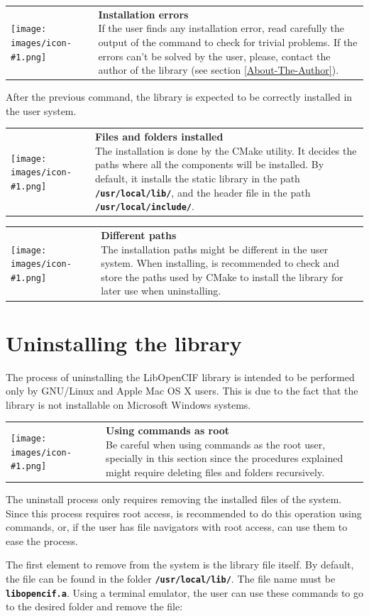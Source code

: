 \documentclass[11pt,twoside,openany,x11names,svgnames]{memoir}
\makeatletter
\newcommand{\IconNote}[3]
{
	\begin{table}[ht]
	\begin{tabular}{ lm{\dimexpr\textwidth-8\tabcolsep-\wd0}@{}}
		\toprule
		\texttt{[image: images/icon-\#1.png]}
		&
		\parbox[t]{155mm}{
		\textbf{#2} \\
		#3
		}
	\end{tabular}
\end{table}
}
\makeatother
\begin{document}
\IconNote
	{warning}
	{Installation errors}
	{If the user finds any installation error, read carefully the output of the command to check for trivial problems. If the errors can't be solved by the user, please, contact the author of the library (see section \ref{About-The-Author}).}

After the previous command, the library is expected to be correctly installed in the user system.

\IconNote
	{info}
	{Files and folders installed}
	{The installation is done by the CMake utility. It decides the paths where all the components will be installed. By default, it installs the static library in the path \textbf{\texttt{/usr/local/lib/}}, and the header file in the path \textbf{\texttt{/usr/local/include/}}.}
	
\IconNote
	{info}
	{Different paths}
	{The installation paths might be different in the user system. When installing, is recommended to check and store the paths used by CMake to install the library for later use when uninstalling.}

\section{Uninstalling the library}\label{Uninstalling-the-library}

The process of uninstalling the LibOpenCIF library is intended to be performed only by GNU/Linux and Apple Mac OS X users. This is due to the fact that the library is not installable on Microsoft Windows systems.

\IconNote
	{error}
	{Using commands as root}
	{Be careful when using commands as the root user, specially in this section since the procedures explained might require deleting files and folders recursively.}

The uninstall process only requires removing the installed files of the system. Since this process requires root access, is recommended to do this operation using commands, or, if the user has file navigators with root access, can use them to ease the process.

The first element to remove from the system is the library file itself. By default, the file can be found in the folder \textbf{\texttt{/usr/local/lib/}}. The file name must be \textbf{\texttt{libopencif.a}}. Using a terminal emulator, the user can use these commands to go to the desired folder and remove the file:
\end{document}
